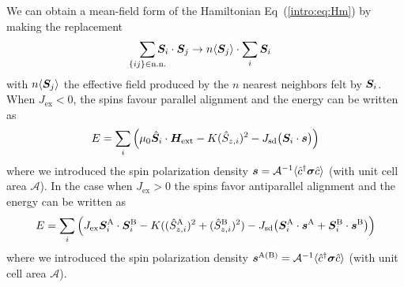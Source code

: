 We can obtain a mean-field form of the Hamiltonian Eq~(\ref{intro:eq:Hm}) by making the replacement
\begin{equation}
    \sum_{\mathclap{\{ij\}\in\text{n.n.}}} \bb{S}_i\cdot\bb{S}_j\rightarrow n\langle\bb{S}_j\rangle\cdot\sum_i \bb{S}_i
\end{equation}
with $n \langle \boldsymbol{S}_j\rangle$ the effective field produced by the $n$ nearest neighbors felt by $\boldsymbol{S}_i$. When $J_\text{ex}<0$, the spins favour parallel alignment and the energy can be written as
\begin{equation}
    E = \sum_{i} \Big(\mu_0 \hat{\boldsymbol{S}}_i\cdot \boldsymbol{H}_{\text{ext}}
    - K(\hat{S}_{z,i})^2
    -J_{\text{sd}}\big(\boldsymbol{S}_i\cdot\boldsymbol{s}\big)
        \Big)
        \label{intro:eq:E1}
\end{equation}
where we introduced the spin polarization density $\boldsymbol{s} = \mathcal{A}^{-1}\langle \hat{c}^\dagger \boldsymbol{\sigma}\hat{c}\rangle$ (with unit cell area $\mathcal{A}$). In the case when $J_\text{ex}>0$ the spins favor antiparallel alignment and the energy can be written as
\begin{equation}
    E = \sum_{i} \Big(J_{\text{ex}}\boldsymbol{S}^\text{A}_i\cdot\boldsymbol{S}^\text{B}_i 
    - K((\hat{S}_{z,i}^\text{A})^2+(\hat{S}_{z,i}^\text{B})^2)
    -J_{\text{sd}}\big(\boldsymbol{S}^\text{A}_i\cdot\boldsymbol{s}^\text{A}+\boldsymbol{S}^\text{B}_i\cdot\boldsymbol{s}^\text{B}\big)
        \Big)
        \label{intro:eq:E2}
\end{equation}
where we introduced the spin polarization density $\boldsymbol{s}^\text{A(B)} = \mathcal{A}^{-1}\langle \hat{c}^\dagger \boldsymbol{\sigma}\hat{c}\rangle$ (with unit cell area $\mathcal{A}$). 

